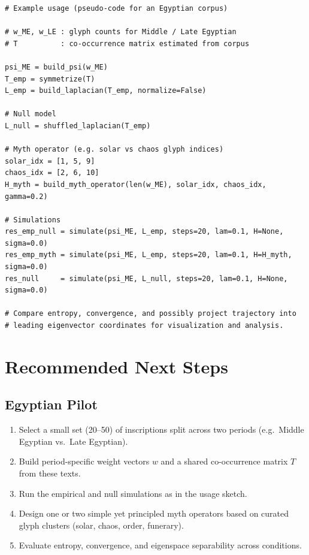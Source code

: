 \documentclass[11pt]{article}
\begin{document}
\begin{verbatim}
# Example usage (pseudo-code for an Egyptian corpus)

# w_ME, w_LE : glyph counts for Middle / Late Egyptian
# T          : co-occurrence matrix estimated from corpus

psi_ME = build_psi(w_ME)
T_emp = symmetrize(T)
L_emp = build_laplacian(T_emp, normalize=False)

# Null model
L_null = shuffled_laplacian(T_emp)

# Myth operator (e.g. solar vs chaos glyph indices)
solar_idx = [1, 5, 9]
chaos_idx = [2, 6, 10]
H_myth = build_myth_operator(len(w_ME), solar_idx, chaos_idx, gamma=0.2)

# Simulations
res_emp_null = simulate(psi_ME, L_emp, steps=20, lam=0.1, H=None, sigma=0.0)
res_emp_myth = simulate(psi_ME, L_emp, steps=20, lam=0.1, H=H_myth, sigma=0.0)
res_null     = simulate(psi_ME, L_null, steps=20, lam=0.1, H=None, sigma=0.0)

# Compare entropy, convergence, and possibly project trajectory into
# leading eigenvector coordinates for visualization and analysis.
\end{verbatim}

\section{Recommended Next Steps}

\subsection{Egyptian Pilot}

\begin{enumerate}[nosep]
  \item Select a small set (20--50) of inscriptions split across two
        periods (e.g.\ Middle Egyptian vs.\ Late Egyptian).
  \item Build period-specific weight vectors \(w\) and a shared
        co-occurrence matrix \(T\) from these texts.
  \item Run the empirical and null simulations as in the usage sketch.
  \item Design one or two simple yet principled myth operators based
        on curated glyph clusters (solar, chaos, order, funerary).
  \item Evaluate entropy, convergence, and eigenspace separability
        across conditions.
\end{enumerate}
\end{document}
